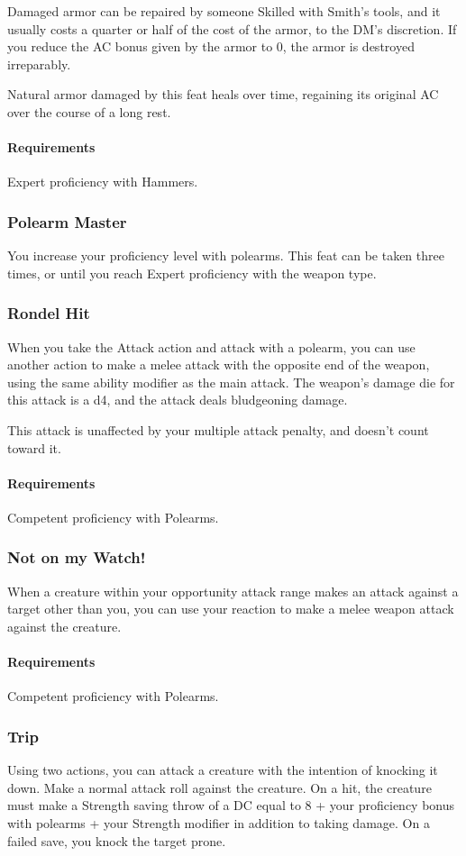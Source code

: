     Damaged armor can be repaired by someone Skilled with Smith's tools, and it usually costs a quarter or half of the cost of the armor, to the DM's discretion.
    If you reduce the AC bonus given by the armor to 0, the armor is destroyed irreparably.

    Natural armor damaged by this feat heals over time, regaining its original AC over the course of a long rest.
    \paragraph{Requirements} Expert proficiency with Hammers.
\subsubsection{Polearm Master} \label{feat::polearmmaster}
    You increase your proficiency level with polearms.
    This feat can be taken three times, or until you reach Expert proficiency with the weapon type.
\subsubsection{Rondel Hit} \label{feat::rondelhit}
    When you take the Attack action and attack with a polearm, you can use another action to make a melee attack with the opposite end of the weapon, using the same ability modifier as the main attack.
    The weapon's damage die for this attack is a d4, and the attack deals bludgeoning damage.

    This attack is unaffected by your multiple attack penalty, and doesn't count toward it.
    \paragraph{Requirements} Competent proficiency with Polearms.
\subsubsection{Not on my Watch!} \label{feat::notonmywatch}
    When a creature within your opportunity attack range makes an attack against a target other than you, you can use your reaction to make a melee weapon attack against the creature.
    \paragraph{Requirements} Competent proficiency with Polearms.
\subsubsection{Trip} \label{feat::trip}
    Using two actions, you can attack a creature with the intention of knocking it down.
    Make a normal attack roll against the creature.
    On a hit, the creature must make a Strength saving throw of a DC equal to 8 + your proficiency bonus with polearms + your Strength modifier in addition to taking damage.
    On a failed save, you knock the target prone.

